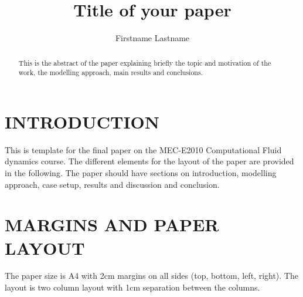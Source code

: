 \documentclass{cfm_paper} %
\begin{document}

\title{Title of your paper}
\author{Firstname Lastname}

\maketitle

\begin{abstract}
This is the abstract of the paper explaining briefly the topic and motivation of the work, the modelling approach, main results and conclusions.
\end{abstract}




\section*{INTRODUCTION} %
This is template for the final paper on the MEC-E2010 Computational Fluid dynamics course. The different elements for the layout of the paper are provided in the following. The paper should have sections on introduction, modelling approach, case setup, results and discussion and conclusion.

\section*{MARGINS AND PAPER LAYOUT}
The paper size is A4 with 2cm margins on all sides (top, bottom, left, right). The layout is two column layout with 1cm separation between the columns. 
\end{document}
